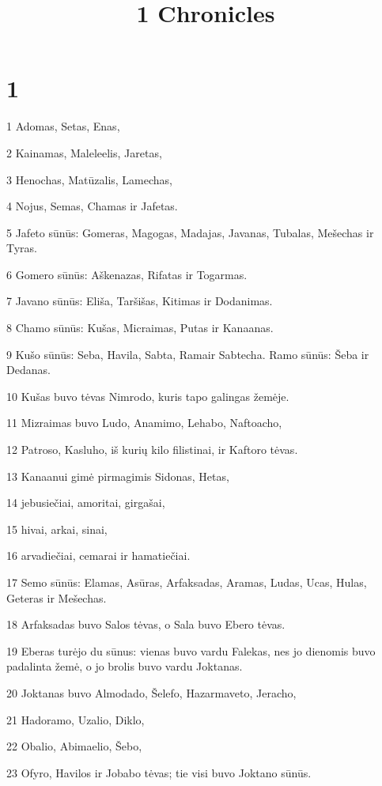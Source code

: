 

\title{
\par 1 Chronicles}

\chapter{1}

\par 1 Adomas, Setas, Enas, 
\par 2 Kainamas, Maleleelis, Jaretas, 
\par 3 Henochas, Matūzalis, Lamechas, 
\par 4 Nojus, Semas, Chamas ir Jafetas. 
\par 5 Jafeto sūnūs: Gomeras, Magogas, Madajas, Javanas, Tubalas, Mešechas ir Tyras. 
\par 6 Gomero sūnūs: Aškenazas, Rifatas ir Togarmas. 
\par 7 Javano sūnūs: Eliša, Taršišas, Kitimas ir Dodanimas. 
\par 8 Chamo sūnūs: Kušas, Micraimas, Putas ir Kanaanas. 
\par 9 Kušo sūnūs: Seba, Havila, Sabta, Ramair Sabtecha. Ramo sūnūs: Šeba ir Dedanas. 
\par 10 Kušas buvo tėvas Nimrodo, kuris tapo galingas žemėje. 
\par 11 Mizraimas buvo Ludo, Anamimo, Lehabo, Naftoacho, 
\par 12 Patroso, Kasluho, iš kurių kilo filistinai, ir Kaftoro tėvas. 
\par 13 Kanaanui gimė pirmagimis Sidonas, Hetas, 
\par 14 jebusiečiai, amoritai, girgašai, 
\par 15 hivai, arkai, sinai, 
\par 16 arvadiečiai, cemarai ir hamatiečiai. 
\par 17 Semo sūnūs: Elamas, Asūras, Arfaksadas, Aramas, Ludas, Ucas, Hulas, Geteras ir Mešechas. 
\par 18 Arfaksadas buvo Salos tėvas, o Sala buvo Ebero tėvas. 
\par 19 Eberas turėjo du sūnus: vienas buvo vardu Falekas, nes jo dienomis buvo padalinta žemė, o jo brolis buvo vardu Joktanas. 
\par 20 Joktanas buvo Almodado, Šelefo, Hazarmaveto, Jeracho, 
\par 21 Hadoramo, Uzalio, Diklo, 
\par 22 Obalio, Abimaelio, Šebo, 
\par 23 Ofyro, Havilos ir Jobabo tėvas; tie visi buvo Joktano sūnūs. 
